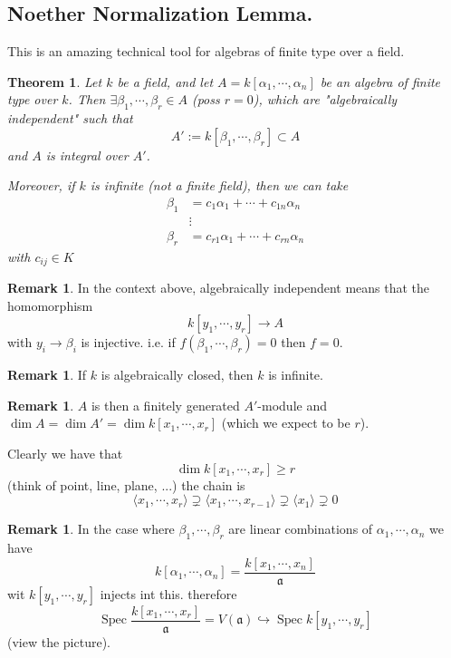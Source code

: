 \documentclass[11pt,a4paper]{article}
\theoremstyle{definition}
\newtheorem{remark}[definition]{Remark}
\theoremstyle{plain}
\newtheorem{theorem}[definition]{Theorem}
\theoremstyle{remark}
\newcommand{\angles}[1]{\langle #1 \rangle}
\newcommand{\Spec}{\operatorname{Spec}}
\begin{document}
\subsection{Noether Normalization Lemma.}
This is an amazing technical tool for algebras of finite type over a field. 
\begin{theorem}
    Let $k$ be a field, and let $A = k[\alpha_1, \cdots, \alpha_n]$ be an algebra of finite type over $k$. Then 
    $\exists \beta_1, \cdots, \beta_r \in A$ (poss $r = 0$), which are "algebraically independent" such that 
    $$A' := k[\beta_1, \cdots, \beta_r] \subset A$$
    and $A$ is integral over $A'$. 

    Moreover, if $k$ is infinite (not a finite field), then we can take 
    \begin{align*}
        \beta_1 &= c_1 \alpha_1 + \cdots + c_{1n} \alpha_n \\
        &\vdots \\
        \beta_r &= c_{r1} \alpha_1 + \cdots + c_{rn} \alpha_n
    \end{align*} 
    with $c_{ij} \in K$
\end{theorem}  

\begin{remark}
    In the context above, algebraically independent means that the homomorphism 
    $$k[y_1, \cdots, y_r] \to A$$
    with $y_i \to \beta_i$ is injective. i.e. if $f(\beta_1, \cdots, \beta_r) = 0$ then $f = 0$.  
\end{remark}

\begin{remark}
    If $k$ is algebraically closed, then $k$ is infinite.
\end{remark}

\begin{remark}
    $A$ is then a finitely generated $A'$-module
    and 
    $\dim A = \dim A' = \dim k[x_1,\cdots, x_r]$ (which we expect to be $r$).
    
    Clearly we have that 
    $$\dim k[x_1, \cdots, x_r] \ge r$$
    (think of point, line, plane, ...) the chain is 
    $$\angles{x_1, \cdots, x_r} \supsetneq \angles{x_1, \cdots, x_{r-1}} \supsetneq \angles{x_1} \supsetneq 0$$
\end{remark}

\begin{remark}
    In the case where $\beta_1, \cdots, \beta_r$ are linear combinations of $\alpha_1, \cdots, \alpha_n$ we have 
    $$k[\alpha_1, \cdots, \alpha_n] = \frac{k[x_1, \cdots, x_n]}{\mathfrak{a}}$$
    wit $k[y_1, \cdots, y_r]$ injects int this. therefore 
    $$\Spec \frac{k[x_1, \cdots, x_r]}{\mathfrak{a}} = V(\mathfrak{a}) \hookrightarrow \Spec k[y_1, \cdots, y_r]$$
    (view the picture). 
\end{remark}
\end{document}
